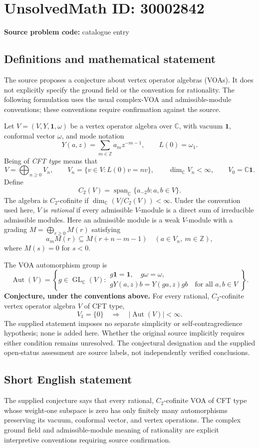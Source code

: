 \documentclass[11pt]{article}
\newcommand{\Z}{\mathbb{Z}}
\newcommand{\C}{\mathbb{C}}
\begin{document}
\section*{UnsolvedMath ID: 30002842}
\textbf{Source problem code:} catalogue entry
\subsection{Definitions and mathematical statement}
The source proposes a conjecture about vertex operator algebras (VOAs). It does not explicitly specify the ground field or the convention for rationality. The following formulation uses the usual complex-VOA and admissible-module conventions; these conventions require confirmation against the source.

Let \(V=(V,Y,\mathbf{1},\omega)\) be a vertex operator algebra over \(\C\), with vacuum \(\mathbf{1}\), conformal vector \(\omega\), and mode notation
\[
Y(a,z)=\sum_{m\in\Z}a_m z^{-m-1},\qquad L(0)=\omega_1.
\]
Being of \emph{CFT type} means that
\[
V=\bigoplus_{n\geq 0}V_n,\qquad
V_n=\{v\in V:L(0)v=nv\},\qquad
\dim_{\C}V_n<\infty,\qquad V_0=\C\mathbf{1}.
\]
Define
\[
C_2(V)=\operatorname{span}_{\C}\{a_{-2}b:a,b\in V\}.
\]
The algebra is \(C_2\)-cofinite if \(\dim_{\C}(V/C_2(V))<\infty\). Under the convention used here, \(V\) is \emph{rational} if every admissible \(V\)-module is a direct sum of irreducible admissible modules. Here an admissible module is a weak \(V\)-module with a grading \(M=\bigoplus_{r\geq0}M(r)\) satisfying
\[
a_m M(r)\subseteq M(r+n-m-1)
\quad(a\in V_n,\ m\in\Z),
\]
where \(M(s)=0\) for \(s<0\).

The VOA automorphism group is
\[
\operatorname{Aut}(V)=\left\{g\in\operatorname{GL}_{\C}(V):
\begin{array}{l}
g\mathbf{1}=\mathbf{1},\quad g\omega=\omega,\\
gY(a,z)b=Y(ga,z)gb\quad\text{for all }a,b\in V
\end{array}\right\}.
\]
\textbf{Conjecture, under the conventions above.} For every rational, \(C_2\)-cofinite vertex operator algebra \(V\) of CFT type,
\[
V_1=\{0\}\quad\Longrightarrow\quad |\operatorname{Aut}(V)|<\infty.
\]
The supplied statement imposes no separate simplicity or self-contragredience hypothesis; none is added here. Whether the original source implicitly requires either condition remains unresolved. The conjectural designation and the supplied open-status assessment are source labels, not independently verified conclusions.
\subsection{Short English statement}
The supplied conjecture says that every rational, \(C_2\)-cofinite VOA of CFT type whose weight-one subspace is zero has only finitely many automorphisms preserving its vacuum, conformal vector, and vertex operations. The complex ground field and admissible-module meaning of rationality are explicit interpretive conventions requiring source confirmation.
\end{document}
